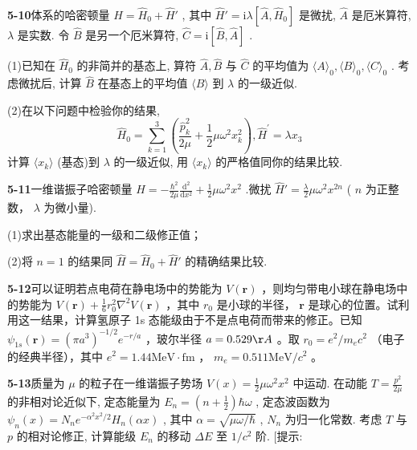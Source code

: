 \vfill

\newpage
\vfill

\noindent
\textbf{5-10}\quad 体系的哈密顿量 $\hat{H} = \hat{H}_0 + \hat{H}'$ , 其中 $\hat{H}' = \mathrm{i}\lambda[\hat{A}, \hat{H}_0]$ 是微扰, $\hat{A}$ 是厄米算符, $\lambda$ 是实数. 令 $\hat{B}$ 是另一个厄米算符, $\hat{C} = \mathrm{i}[\hat{B}, \hat{A}]$ . 

(1)已知在 $\hat{H}_0$ 的非简并的基态上, 算符 $\hat{A}, \hat{B}$ 与 $\hat{C}$ 的平均值为 $\langle A \rangle_0, \langle B \rangle_0, \langle C \rangle_0$ . 考虑微扰后, 计算 $\hat{B}$ 在基态上的平均值 $\langle B \rangle$ 到 $\lambda$ 的一级近似. 

(2)在以下问题中检验你的结果,
$$
\hat {H} _ {0} = \sum_ {k = 1} ^ {3} \left(\frac {\hat {p} _ {k} ^ {2}}{2 \mu} + \frac {1}{2} \mu \omega^ {2} x _ {k} ^ {2}\right), \hat {H} ^ {\prime} = \lambda x _ {3}
$$
计算 $\langle x_k\rangle$ (基态)到 $\lambda$ 的一级近似, 用 $\langle x_k\rangle$ 的严格值同你的结果比较.

\vfill

\newpage
\vfill

\noindent
\textbf{5-11}\quad 一维谐振子哈密顿量 $\hat{H} = -\frac{\hbar^2}{2\mu}\frac{\mathrm{d}^2}{\mathrm{d}x^2} +\frac{1}{2}\mu \omega^2 x^2$ .微扰 $\hat{H}' = \frac{\lambda}{2}\mu \omega^2 x^{2n}$ ( $n$ 为正整数， $\lambda$ 为微小量).

(1)求出基态能量的一级和二级修正值；

(2)将 $n = 1$ 的结果同 $\hat{H} = \hat{H}_0 + \hat{H}'$ 的精确结果比较.

\vfill

\newpage
\vfill

\noindent
\textbf{5-12}\quad 可以证明若点电荷在静电场中的势能为 $V(\pmb{r})$ ，则均匀带电小球在静电场中的势能为 $V(\pmb{r}) + \frac{1}{6} r_0^2 \nabla^2 V(\pmb{r})$ ，其中 $r_0$ 是小球的半径， $\pmb{r}$ 是球心的位置。试利用这一结果，计算氢原子 1s 态能级由于不是点电荷而带来的修正。已知 $\psi_{1s}(\pmb{r}) = \left(\pi a^3\right)^{-1/2} e^{-r/a}$ ，玻尔半径 $a = 0.529\AA$ 。取 $r_0 = e^2 / m_e c^2$ （电子的经典半径），其中 $e^2 = 1.44\mathrm{MeV} \cdot \mathrm{fm}$ ， $m_e = 0.511\mathrm{MeV} / c^2$ 。

\vfill

\newpage
\vfill

\noindent
\textbf{5-13}\quad 质量为 $\mu$ 的粒子在一维谐振子势场 $V(x) = \frac{1}{2}\mu \omega^2 x^2$ 中运动. 在动能 $T = \frac{p^2}{2\mu}$ 的非相对论近似下, 定态能量为 $E_n = \left(n + \frac{1}{2}\right)\hbar \omega$ , 定态波函数为 $\psi_n(x) = N_n e^{-\alpha^2 x^2 / 2} H_n(\alpha x)$ , 其中 $\alpha = \sqrt{\mu \omega / \hbar}$ , $N_n$ 为归一化常数. 考虑 $T$ 与 $p$ 的相对论修正, 计算能级 $E_n$ 的移动 $\Delta E$ 至 $1 / c^2$ 阶. [提示:

